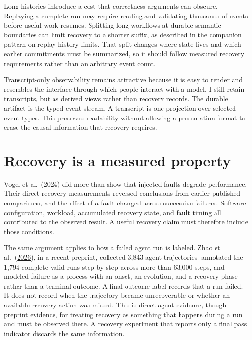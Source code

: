 Long histories introduce a cost that correctness arguments can obscure. Replaying a complete run may require reading and validating thousands of events before useful work resumes. Splitting long workflows at durable semantic boundaries can limit recovery to a shorter suffix, as described in the companion pattern on replay-history limits. That split changes where state lives and which earlier commitments must be summarized, so it should follow measured recovery requirements rather than an arbitrary event count.

Transcript-only observability remains attractive because it is easy to render and resembles the interface through which people interact with a model. I still retain transcripts, but as derived views rather than recovery records. The durable artifact is the typed event stream. A transcript is one projection over selected event types. This preserves readability without allowing a presentation format to erase the causal information that recovery requires.

\hypertarget{recovery-is-a-measured-property}{%
\section{Recovery is a measured property}\label{recovery-is-a-measured-property}}

Vogel et al.~(2024) did more than show that injected faults degrade performance. Their direct recovery measurements reversed conclusions from earlier published comparisons, and the effect of a fault changed across successive failures. Software configuration, workload, accumulated recovery state, and fault timing all contributed to the observed result. A useful recovery claim must therefore include those conditions.

The same argument applies to how a failed agent run is labeled. Zhao et al.~(\href{https://arxiv.org/abs/2607.09510}{2026}), in a recent preprint, collected 3,843 agent trajectories, annotated the 1,794 complete valid runs step by step across more than 63,000 steps, and modeled failure as a process with an onset, an evolution, and a recovery phase rather than a terminal outcome. A final-outcome label records that a run failed. It does not record when the trajectory became unrecoverable or whether an available recovery action was missed. This is direct agent evidence, though preprint evidence, for treating recovery as something that happens during a run and must be observed there. A recovery experiment that reports only a final pass indicator discards the same information.

